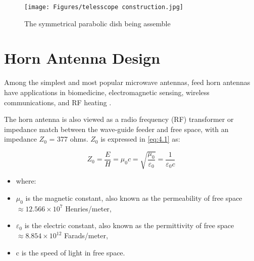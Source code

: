 {\begin{figure}
    \centering
\texttt{[image: Figures/telesscope construction.jpg]}
\caption{The symmetrical parabolic dish being assemble}
 \label{fig:4.2}
\end{figure}

\section{Horn Antenna Design}


Among the simplest and most popular microwave antennas, feed horn antennas have applications in biomedicine, electromagnetic sensing, wireless communications, and RF heating \cite{baltzis2010polynomial,ja2018evaluation,ja2018evaluation}.

The horn antenna is also viewed as a radio frequency (RF) transformer or impedance match between the wave-guide feeder and free space, with an  impedance \(Z_0\) = 377 ohms. \(Z_0\) is expressed in \ref{eq:4.1} as:

\begin{equation}
    Z_0 = \frac{E}{H} = \mu_0c = \sqrt{\frac{\mu_0}{\varepsilon_0}} =\frac{1}{\varepsilon_0c}
\end{equation}
\label{eq:4.1}

\begin{itemize}[label={}]

\item where:
\item \(\mu_0\) is the magnetic constant, also known as the permeability of free space \( \approx 12.566 \times10^7\) Henries/meter,
\item \(\varepsilon_0\) is the electric constant, also known as the permittivity of free space\( \approx 8.854 \times 10^12\) Farads/meter,
\item c is the speed of light in free space.
\end{itemize}

}
